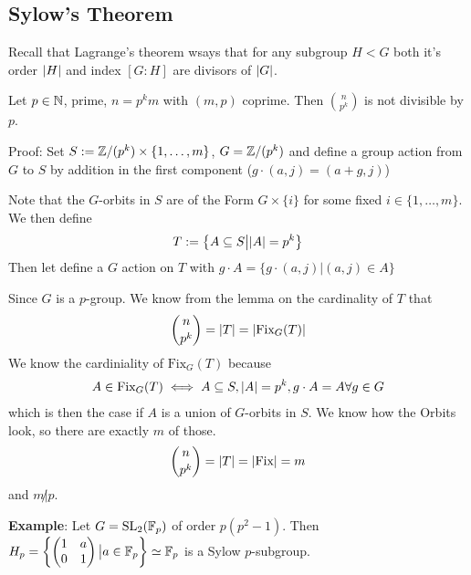 \subsection{Sylow's Theorem}
Recall that Lagrange's theorem wsays that for any subgroup $H < G$ both it's order $\vert H\vert$ and index $[G:H]$ are divisors of $\vert G\vert$.



\begin{lemma}[]
	Let $p \in \mathbb{N}$, prime, $n = p^{k}m$ with $(m,p)$ coprime. Then $\binom{n}{p^k}$ is not divisible by $p$.
\end{lemma}

Proof: Set $S := \mathbb{Z}/(p^{k}) \times \{1, \ldots, m\}$, $G = \mathbb{Z}/(p^{k})$ and define a group action from $G$ to $S$ by addition in the first component ($g \cdot (a,j) = (a + g, j)$)

Note that the $G$-orbits in $S$ are of the Form $G \times \{i\}$ for some fixed $i \in \{1, \ldots, m\}$. We then define
\begin{align*}
	T:= \left\{A \subseteq S \big\vert \vert A\vert = p^{k}\right\}
\end{align*}
Then let define a $G$ action on $T$ with $g \cdot A = \{g \cdot (a,j)\big\vert (a,j) \in A\}$

Since $G$ is a $p$-group. We know from the lemma on the cardinality of $T$ that
\begin{align*}
	\binom{n}{p^k} = \vert T\vert = \vert\text{Fix}_G(T)\vert
\end{align*}
We know the cardiniality of $\text{Fix}_G(T)$ because
\begin{align*}
	A \in \text{Fix}_G(T) \iff A \subseteq S, \vert A\vert = p^{k}, g \cdot A = A \forall g \in G 
\end{align*}
which is then the case if $A$ is a union of $G$-orbits in $S$. We know how the Orbits look, so there are exactly $m$ of those.
\begin{align*}
	\binom{n}{p^{k}} = \vert T\vert = \vert\text{Fix}\vert = m
\end{align*}
and $m\not| p$.


\textbf{Example}: \quad Let $G = \text{SL}_2(\mathbb{F}_p)$ of order $p(p^{2}-1)$. Then $H_p = \left\{\begin{pmatrix}
1 & a\\
0 & 1
\end{pmatrix} \big\vert a \in \mathbb{F}_p\right\} \simeq \mathbb{F}_p$ is a Sylow $p$-subgroup.


